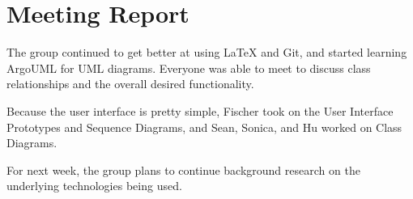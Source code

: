 \section{Meeting Report}

The group continued to get better at using LaTeX and Git, and started learning ArgoUML for UML diagrams. Everyone was able to meet to discuss class relationships and the overall desired functionality. 

Because the user interface is pretty simple, Fischer took on the User Interface Prototypes and Sequence Diagrams, and Sean, Sonica, and Hu worked on Class Diagrams.

For next week, the group plans to continue background research on the underlying technologies being used.